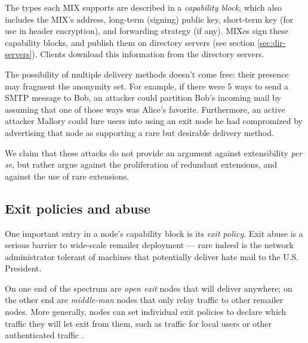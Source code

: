 \documentclass{llncs}
\begin{document}
The types each MIX supports are described in a \emph{capability
block}, which also includes the MIX's address, long-term (signing)
public key, short-term key (for use in header encryption), and
forwarding strategy (if any).  MIXes sign these capability blocks, and
publish them on directory servers (see section \ref{sec:dir-servers}).
Clients download this information from the directory servers.

%

The possibility of multiple delivery methods doesn't come free: their
presence may fragment the anonymity set.  For example, if there were 5
ways to send a SMTP message to Bob, an attacker could partition Bob's
incoming mail by assuming that one of those ways was Alice's favorite.
Furthermore, an active attacker Mallory could lure users into using an
exit node he had compromized by advertising that node as supporting a
rare but desirable delivery method.

We claim that these attacks do not provide an argument against
extensibility \emph{per se}, but rather argue against the proliferation
of redundant extensions, and against the use of rare extensions.  

\subsection{Exit policies and abuse}
\label{subsec:exitpolicies}

One important entry in a node's capability block is its \emph{exit
policy}. Exit abuse is a serious barrier to wide-scale remailer deployment
--- rare indeed is the network administrator tolerant of machines that
potentially deliver hate mail to the U.S. President.

On one end of the spectrum are \emph{open exit} nodes that will
deliver anywhere; on the other end are \emph{middle-man} nodes that
only relay traffic to other remailer nodes. More generally, nodes can
set individual exit policies to declare which traffic they will let
exit from them, such as traffic for local users or other authenticated
traffic \cite{onion-discex00}.
\end{document}
